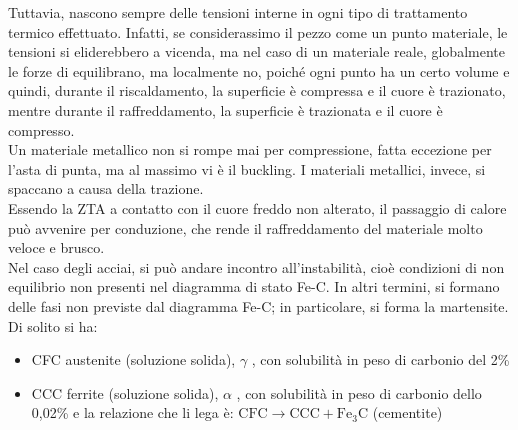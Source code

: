 Tuttavia, nascono sempre delle tensioni interne in ogni tipo di trattamento termico effettuato. Infatti, se considerassimo il pezzo come un punto materiale, le tensioni si eliderebbero a vicenda, ma nel caso di un materiale reale, globalmente le forze di equilibrano, ma localmente no, poiché ogni punto ha un certo volume e quindi, durante il riscaldamento, la superficie è compressa e il cuore è trazionato, mentre durante il raffreddamento, la superficie è trazionata e il cuore è compresso.\\
Un materiale metallico non si rompe mai per compressione, fatta eccezione per l’asta di punta, ma al massimo vi è il buckling. I materiali metallici, invece, si spaccano a causa della trazione.\\
Essendo la ZTA a contatto con il cuore freddo non alterato, il passaggio di calore può avvenire per conduzione, che rende il raffreddamento del materiale molto veloce e brusco.\\
Nel caso degli acciai, si può andare incontro all’instabilità, cioè condizioni di non equilibrio non presenti nel diagramma di stato Fe-C. In altri termini, si formano delle fasi non previste dal diagramma Fe-C; in particolare, si forma la martensite. Di solito si ha:
\begin{itemize}
    \item  CFC austenite (soluzione solida), $\gamma$ , con solubilità in peso di carbonio del 2\%
    \item CCC ferrite (soluzione solida), $\alpha$ , con solubilità in peso di carbonio dello 0,02\% e la relazione che li lega è:
$\mathrm{CFC \to CCC + Fe_3C}$ (cementite)
\end{itemize}

